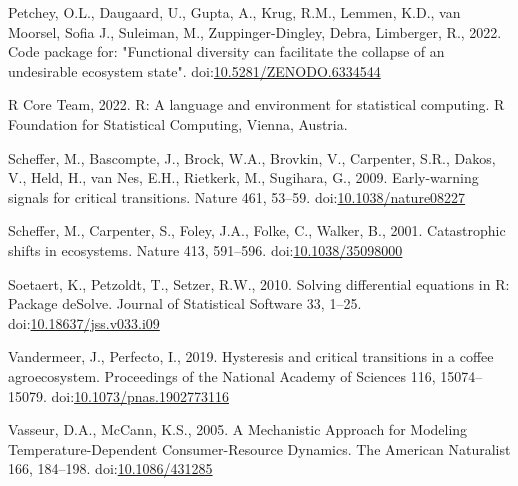 \documentclass[
]{article}
\newlength{\cslhangindent}
\newlength{\cslentryspacingunit} %
\newenvironment{CSLReferences}[2] %
 {%
  \setlength{\parindent}{0pt}
  \ifodd #1
  \let\oldpar\par
  \def\par{\hangindent=\cslhangindent\oldpar}
  \fi
  \setlength{\parskip}{#2\cslentryspacingunit}
 }%
 {}
\begin{document}
\begin{CSLReferences}{1}{0}
\leavevmode{}%
Petchey, O.L., Daugaard, U., Gupta, A., Krug, R.M., Lemmen, K.D., van Moorsel, Sofia J., Suleiman, M., Zuppinger-Dingley, Debra, Limberger, R., 2022. Code package for: "{Functional} diversity can facilitate the collapse of an undesirable ecosystem state". doi:\href{https://doi.org/10.5281/ZENODO.6334544}{10.5281/ZENODO.6334544}

\leavevmode{}%
R Core Team, 2022. R: {A} language and environment for statistical computing. {R Foundation for Statistical Computing}, {Vienna, Austria}.

\leavevmode{}%
Scheffer, M., Bascompte, J., Brock, W.A., Brovkin, V., Carpenter, S.R., Dakos, V., Held, H., van Nes, E.H., Rietkerk, M., Sugihara, G., 2009. Early-warning signals for critical transitions. Nature 461, 53--59. doi:\href{https://doi.org/10.1038/nature08227}{10.1038/nature08227}

\leavevmode{}%
Scheffer, M., Carpenter, S., Foley, J.A., Folke, C., Walker, B., 2001. Catastrophic shifts in ecosystems. Nature 413, 591--596. doi:\href{https://doi.org/10.1038/35098000}{10.1038/35098000}

\leavevmode{}%
Soetaert, K., Petzoldt, T., Setzer, R.W., 2010. Solving differential equations in {R}: {Package deSolve}. Journal of Statistical Software 33, 1--25. doi:\href{https://doi.org/10.18637/jss.v033.i09}{10.18637/jss.v033.i09}

\leavevmode{}%
Vandermeer, J., Perfecto, I., 2019. Hysteresis and critical transitions in a coffee agroecosystem. Proceedings of the National Academy of Sciences 116, 15074--15079. doi:\href{https://doi.org/10.1073/pnas.1902773116}{10.1073/pnas.1902773116}

\leavevmode{}%
Vasseur, D.A., McCann, K.S., 2005. A {Mechanistic Approach} for {Modeling Temperature}-{Dependent Consumer}-{Resource Dynamics}. The American Naturalist 166, 184--198. doi:\href{https://doi.org/10.1086/431285}{10.1086/431285}

\end{CSLReferences}
\end{document}
